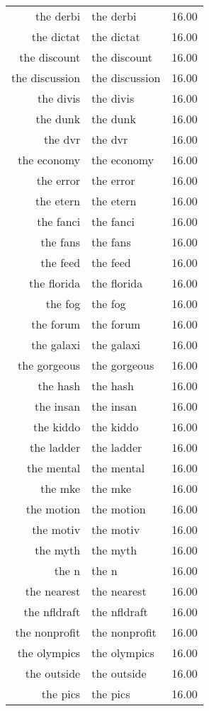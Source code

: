\begin{table}[ht]
\begin{tabular}{rlr}
  the derbi & the derbi & 16.00 \\ 
  the dictat & the dictat & 16.00 \\ 
  the discount & the discount & 16.00 \\ 
  the discussion & the discussion & 16.00 \\ 
  the divis & the divis & 16.00 \\ 
  the dunk & the dunk & 16.00 \\ 
  the dvr & the dvr & 16.00 \\ 
  the economy & the economy & 16.00 \\ 
  the error & the error & 16.00 \\ 
  the etern & the etern & 16.00 \\ 
  the fanci & the fanci & 16.00 \\ 
  the fans & the fans & 16.00 \\ 
  the feed & the feed & 16.00 \\ 
  the florida & the florida & 16.00 \\ 
  the fog & the fog & 16.00 \\ 
  the forum & the forum & 16.00 \\ 
  the galaxi & the galaxi & 16.00 \\ 
  the gorgeous & the gorgeous & 16.00 \\ 
  the hash & the hash & 16.00 \\ 
  the insan & the insan & 16.00 \\ 
  the kiddo & the kiddo & 16.00 \\ 
  the ladder & the ladder & 16.00 \\ 
  the mental & the mental & 16.00 \\ 
  the mke & the mke & 16.00 \\ 
  the motion & the motion & 16.00 \\ 
  the motiv & the motiv & 16.00 \\ 
  the myth & the myth & 16.00 \\ 
  the n & the n & 16.00 \\ 
  the nearest & the nearest & 16.00 \\ 
  the nfldraft & the nfldraft & 16.00 \\ 
  the nonprofit & the nonprofit & 16.00 \\ 
  the olympics & the olympics & 16.00 \\ 
  the outside & the outside & 16.00 \\ 
  the pics & the pics & 16.00 \\ 

\end{tabular}
\end{table}
